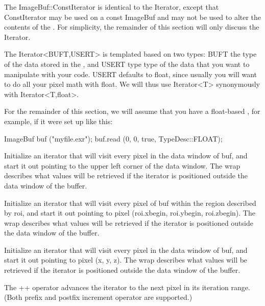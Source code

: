 The {\cf ImageBuf::ConstIterator} is identical to the {\cf Iterator},
except that {\cf ConstIterator} may be used on a {\cf const ImageBuf}
and may not be used to alter the contents of the \ImageBuf.  For 
simplicity, the remainder of this section will only discuss the 
{\cf Iterator}.

The {\cf Iterator<BUFT,USERT>} is templated based on two types: {\cf
  BUFT} the type of the data stored in the \ImageBuf, and {\cf USERT}
type type of the data that you want to manipulate with your code.  {\cf
  USERT} defaults to {\cf float}, since usually you will want to do all
your pixel math with {\cf float}.  We will thus use {\cf Iterator<T>}
synonymously with {\cf Iterator<T,float>}.

For the remainder of this section, we will assume that you have a
{\cf float}-based \ImageBuf, for example, if it were set up like this:

\begin{code}
ImageBuf buf ("myfile.exr");
buf.read (0, 0, true, TypeDesc::FLOAT);
\end{code}


Initialize an iterator that will visit every pixel in the data window
of {\cf buf}, and start it out pointing to the upper left corner of
the data window.  The {\cf wrap} describes what values will be retrieved
if the iterator is positioned outside the data window of the buffer.
\apiend

Initialize an iterator that will visit every pixel of {\cf buf} 
within the region
described by {\cf roi}, and start it out pointing to pixel ({\cf roi.xbegin, roi.ybegin, roi.zbegin}).
The {\cf wrap} describes what values will be retrieved
if the iterator is positioned outside the data window of the buffer.
\apiend

Initialize an iterator that will visit every pixel in the data window
of {\cf buf}, and start it out pointing to pixel ({\cf x, y, z}).
The {\cf wrap} describes what values will be retrieved
if the iterator is positioned outside the data window of the buffer.
\apiend

The {\cf ++} operator advances the iterator to the next pixel in its
iteration range.  (Both prefix and postfix increment operator are
supported.)
\apiend

